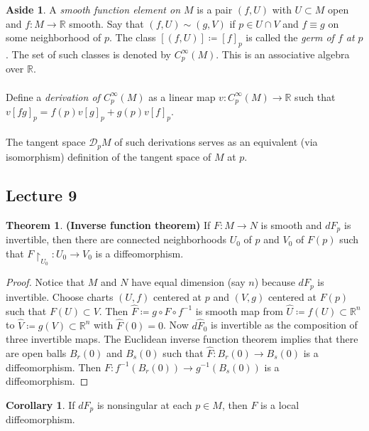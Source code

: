 \documentclass[10pt,letterpaper,cm]{nupset}
\theoremstyle{definition}
\newtheorem{theorem}{Theorem}
\newtheorem{corollary}{Corollary}
\newtheorem*{aside}{Aside}
\newcommand{\R}{\mathbb R}
\newcommand{\1}{\mathbf{1}}
\newcommand{\0}{\vec 0}
\begin{document}
\begin{aside}
A \textit{smooth function element on $M$} is a pair $(f, U)$ with $U\subset M$ open and $f: M \to \R$ smooth. Say that $(f, U) \sim (g, V)$ if $p\in U \cap V$ and $f \equiv g$ on some neighborhood of $p$. The class $[(f, U)]\coloneqq [f]_p$ is called the \textit{germ of $f$ at $p$}. The set of such classes is denoted by $C^{\infty}_p(M)$. This is an associative algebra over $\R$. \\ \\ Define a \textit{derivation of $C^{\infty}_p(M)$} as a linear map $v: C^{\infty}_p(M) \to \R$ such that $v[fg]_p = f(p)v[g]_p+g(p)v[f]_p$.  \\ \\ The tangent space $\mathcal{D}_pM$ of such derivations serves as an equivalent (via isomorphism) definition of the tangent space of $M$ at $p$.
\end{aside}

\subsection{Lecture 9}

\begin{theorem}{\textbf{(Inverse function theorem)}}
If $F: M \to N$ is smooth and $dF_p$ is invertible, then there are connected neighborhoods  $U_0$ of $p$ and $V_0$ of $F(p)$ such that $F\restriction_{U_0}: U_0 \to V_0$ is a diffeomorphism.
\end{theorem}
\begin{proof}
Notice that $M$ and $N$ have equal dimension (say $n$) because $dF_p$ is invertible. Choose charts $(U, f)$ centered at $p$ and $(V, g)$ centered at $F(p)$ such that $F(U) \subset V$. Then $\widehat{F}\coloneqq  g \circ F \circ f^{-1}$ is smooth map from $\widehat{U}\coloneqq f(U)\subset \R^n$ to $\widehat{V}\coloneqq g(V)\subset \R^n$ with $\widehat{F}(0) =0$. Now $d\widehat{F}_0$ is invertible as the composition of three invertible maps. The Euclidean inverse function theorem implies that there are open balls $B_{r}(0)$ and $B_s(0)$ such that $\widehat{F} : B_r(0) \to B_s(0)$ is a diffeomorphism. Then $F: f^{-1}(B_r(0)) \to g^{-1}(B_s(0))$ is a diffeomorphism.
\end{proof}

\begin{corollary}
If $dF_p$ is nonsingular at each $p\in M$, then $F$ is a local diffeomorphism.
\end{corollary}
\end{document}
